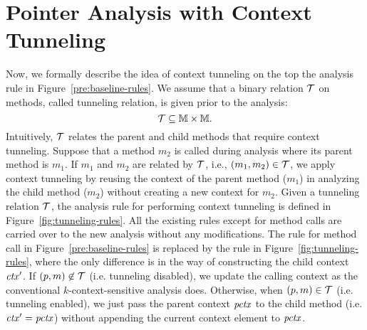 
\section{Pointer Analysis with Context Tunneling} \label{sec:tunneling}
Now, we formally describe the idea of context tunneling on the top the analysis rule in Figure~\ref{pre:baseline-rules}.
We assume that a binary relation $\mathcal{T}$ on methods,
called tunneling relation, is given prior to the analysis:
\[
  \mathcal{T} \subseteq {\mathbb{M}} \times {\mathbb{M}}.
\]
Intuitively, $\mathcal{T}$ relates the parent and child methods
that require context tunneling. Suppose that a method
$m_2$ is called during analysis where its parent method is $m_1$. If
$m_1$ and $m_2$ are related by $\mathcal{T}$, i.e., $(m_1,m_2) \in \mathcal{T}$, we apply context tunneling by
reusing the context of the parent method ($m_1$) in analyzing the
child method ($m_2$) without creating a new context for $m_2$.  Given
a tunneling relation $\mathcal{T}$, the analysis rule for
performing context tunneling is defined in
Figure~\ref{fig:tunneling-rules}. All the existing rules except for
method calls are carried over to the new analysis without any modifications.
The rule for method call in Figure~\ref{pre:baseline-rules} is
replaced by the rule in Figure~\ref{fig:tunneling-rules}, where the
only difference is in the way of constructing the child context
${\it ctx}'$. If $(p,m) \not\in \mathcal{T}$ (i.e. tunneling
disabled), we update the calling context as the conventional $k$-context-sensitive
analysis does. Otherwise, when $(p,m)\in \mathcal{T}$
(i.e. tunneling enabled), we just pass the parent context ${\it pctx}$ to
the child method (i.e. ${\it ctx}' = {\it pctx}$) without appending the current
context element to ${\it pctx}$.


